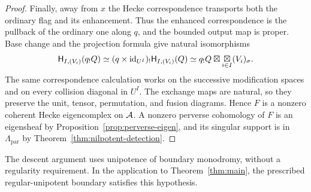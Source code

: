 \begin{proof}
Finally, away from $x$ the Hecke correspondence transports both the
ordinary flag and its enhancement.  Thus the enhanced
correspondence is the pullback of the ordinary one along $q$, and
the bounded output map is proper.  Base change and the projection
formula give natural isomorphisms
\[
 \mathsf H_{I,(V_i)}(q_!Q)
 \simeq(q\times\mathrm{id}_{U^I})_!
                   \mathsf H_{I,(V_i)}(Q)
 \simeq q_!Q\boxtimes\mathop{\boxtimes}_{i\in I}(V_i)_\sigma.
\]
The same correspondence calculation works on the successive
modification spaces and on every collision diagonal in $U^I$.
The exchange maps are natural, so they preserve the unit, tensor,
permutation, and fusion diagrams.  Hence $F$ is a nonzero coherent
Hecke eigencomplex on $\mathcal A$.  A nonzero perverse cohomology of $F$
is an eigensheaf by Proposition~\ref{prop:perverse-eigen}, and its
singular support is in $\Lambda_{\mathrm{par}}$ by
Theorem~\ref{thm:nilpotent-detection}.
\end{proof}

The descent argument uses unipotence of boundary monodromy, without
a regularity requirement.  In the application to Theorem~\ref{thm:main},
the prescribed regular-unipotent boundary satisfies this hypothesis.
